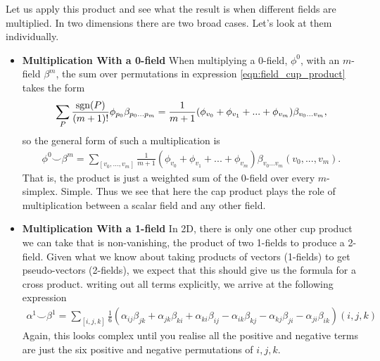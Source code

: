 \documentclass[11pt, oneside]{article} %
\numberwithin{equation}{section}
\begin{document}
Let us apply this product and see what the result is when different fields are multiplied. In two dimensions there are two broad cases. Let's look at them individually.

\begin{itemize}
    \item {\bf Multiplication With a 0-field}
When multiplying a 0-field, $\phi^0$, with an $m$-field $\beta^m$, the sum over permutations in expression \ref{eqn:field_cup_product} takes the form
\begin{align}
    \sum_{P} \frac{\textup{sgn}(P)}{(m+1)!} \phi_{p_0}\beta_{p_0 ...p_{m}} = \frac{1}{m+1}(\phi_{v_0}+\phi_{v_1}+ ... +\phi_{v_m})
    \beta_{v_0...v_m},
\end{align}
so the general form of such a multiplication is
\begin{align}
    \phi^0 \smile \beta^m = \sum_{[v_0, ... ,v_m]}\frac 1 {m+1}
    (\phi_{v_0}+\phi_{v_1}+ ... +\phi_{v_m})
    \beta_{v_0...v_m}
    (v_0,...,v_{m}).
\end{align}
That is, the product is just a weighted sum of the 0-field over every $m$-simplex. Simple. Thus we see that here the cap product plays the role of multiplication between a scalar field and any other field. 

\item{\bf Multiplication With a 1-field}
In 2D, there is only one other cup product we can take that is non-vanishing, the product of two 1-fields to produce a 2-field. Given what we know about taking products of vectors (1-fields) to get pseudo-vectors (2-fields), we expect that this should give us the formula for a cross product. writing out all terms explicitly, we arrive at the following expression
\begin{align}
    \alpha^1 \smile \beta^1 = \sum_{[i,j,k]}\frac{1}{6}
    (
    \alpha_{ij} \beta_{jk}
    +\alpha_{jk} \beta_{ki}
    +\alpha_{ki} \beta_{ij}
    -\alpha_{ik} \beta_{kj}
    -\alpha_{kj} \beta_{ji}
    -\alpha_{ji} \beta_{ik}
    )
    (i,j,k)
\end{align}
Again, this looks complex until you realise all the positive and negative terms are just the six positive and negative permutations of $i,j,k$.
\end{itemize}
\end{document}
